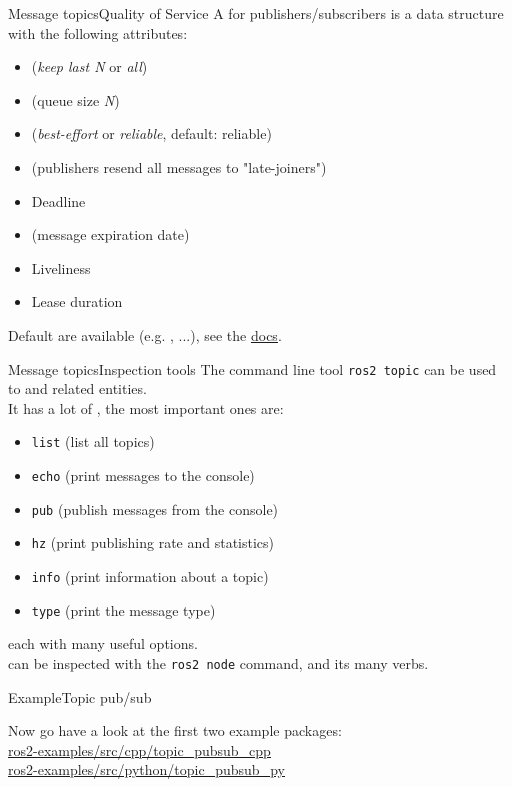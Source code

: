 \begin{frame}{Message topics}{Quality of Service}
	A  for publishers/subscribers is a data structure with the following attributes:
	\begin{itemize}
		\item {} (\emph{keep last N} or \emph{all})
		\item {} (queue size \emph{N})
		\item {} (\emph{best-effort} or \emph{reliable}, default: reliable)
		\item {} (publishers resend all messages to "late-joiners")
		\item Deadline
		\item {} (message expiration date)
		\item Liveliness
		\item Lease duration
	\end{itemize}
	Default  are available (e.g. , ...), see the \href{https://docs.ros.org/en/humble/Concepts/About-Quality-of-Service-Settings.html}{\color{blue}\underline{docs}}.
\end{frame}
\begin{frame}{Message topics}{Inspection tools}
  The command line tool \texttt{ros2 topic} can be used to  and related entities.\\
  It has a lot of , the most important ones are:
  \begin{itemize}
    \item \texttt{list} (list all topics)
    \item \texttt{echo} (print messages to the console)
    \item \texttt{pub} (publish messages from the console)
    \item \texttt{hz} (print publishing rate and statistics)
    \item \texttt{info} (print information about a topic)
    \item \texttt{type} (print the message type)
  \end{itemize}
  each with many useful options.\\
   can be inspected with the \texttt{ros2 node} command, and its many verbs.
\end{frame}

\begin{frame}{Example}{Topic pub/sub}
  \begin{block}{}
    \centering
	  Now go have a look at the first two example packages:\\
    \href{https://github.com/IntelligentSystemsLabUTV/ros2-examples/tree/humble/src/cpp/topic_pubsub_cpp}{\color{blue}\underline{ros2-examples/src/cpp/topic\_pubsub\_cpp}}\\
    \smallskip
    \href{https://github.com/IntelligentSystemsLabUTV/ros2-examples/tree/humble/src/python/topic_pubsub_py}{\color{blue}\underline{ros2-examples/src/python/topic\_pubsub\_py}}
  \end{block}
\end{frame}

